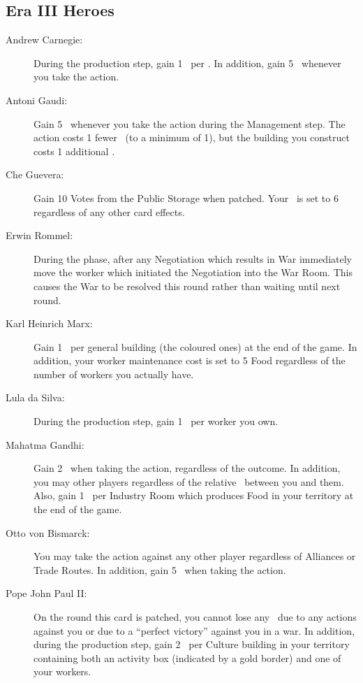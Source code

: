 \documentclass[10pt,twocolumn]{article}
\begin{document}
\begin{appendices}
\subsection{Era III Heroes}
\begin{description}
\item[Andrew Carnegie:] During the production step, gain 1 \money\ per \tra. In addition, gain 5 \vps\ whenever you take the  action.
\item[Antoni Gaudi:] Gain 5 \vps\ whenever you take the  action during the Management step. The  action costs 1 fewer \polfs\ (to a minimum of 1), but the building you construct costs 1 additional \mineral.
\item[Che Guevera:] Gain 10 Votes from the Public Storage when patched. Your \pol\ is set to 6 regardless of any other card effects.
\item[Erwin Rommel:] During the  phase, after any Negotiation which results in War immediately move the worker which initiated the Negotiation into the War Room. This causes the War to be resolved this round rather than waiting until next round.
\item[Karl Heinrich Marx:] Gain 1 \vp\ per general building (the coloured ones) at the end of the game. In addition, your worker maintenance cost is set to 5 Food regardless of the number of workers you actually have.
\item[Lula da Silva:]During the production step, gain 1 \vp\ per worker you own.
\item[Mahatma Gandhi:] Gain 2 \vps\ when taking the  action, regardless of the outcome. In addition, you may  other players regardless of the relative \mil\ between you and them. Also, gain 1 \vp\ per Industry Room which produces Food in your territory at the end of the game.
\item[Otto von Bismarck:] You may take the  action against any other player regardless of Alliances or Trade Routes. In addition, gain 5 \vps\ when taking the  action.
\item[Pope John Paul II:] On the round this card is patched, you cannot lose any \vps\ due to any  actions against you or due to a ``perfect victory'' against you in a war. In addition, during the production step, gain 2 \vps\ per Culture building in your territory containing both an activity box (indicated by a gold border) and one of your workers.
\end{description}


\end{appendices}
\end{document}
